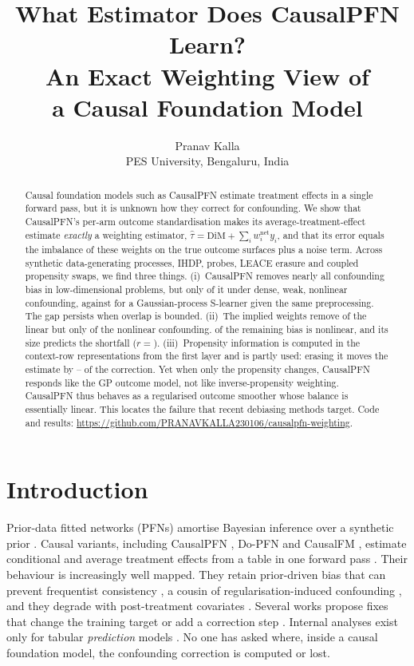 \documentclass{article}
\title{What Estimator Does CausalPFN Learn?\\An Exact Weighting View of\\a Causal Foundation Model}
\author{Pranav Kalla\\ PES University, Bengaluru, India}
\newcommand{\DiM}{\mathrm{DiM}}
\newcommand{\that}{\hat\tau}
\begin{document}
\maketitle
{}\renewcommand{\headrulewidth}{0pt}

\begin{abstract}
Causal foundation models such as CausalPFN estimate treatment effects in a single forward pass, but it is unknown how they correct for confounding. We show that CausalPFN's per-arm outcome standardisation makes its average-treatment-effect estimate \emph{exactly} a weighting estimator, $\that = \DiM + \sum_i w^{\mathrm{net}}_i y_i$, and that its error equals the imbalance of these weights on the true outcome surfaces plus a noise term. Across \nDGPhone{} synthetic data-generating processes, IHDP, probes, LEACE erasure and coupled propensity swaps, we find three things. (i)~CausalPFN removes nearly all confounding bias in low-dimensional problems, but only \kHardPFN{} of it under dense, weak, nonlinear confounding, against \kHardGP{} for a Gaussian-process S-learner given the same preprocessing. The gap persists when overlap is bounded. (ii)~The implied weights remove \linRemoved{} of the linear but only \nonlinRemoved{} of the nonlinear confounding. \nonlinShareLeft{} of the remaining bias is nonlinear, and its size predicts the shortfall ($r={}$\corrKappaNonlin). (iii)~Propensity information is computed in the context-row representations from the first layer and is partly used: erasing it moves the estimate by \eraseOne{}--\eraseAll{} of the correction. Yet when only the propensity changes, CausalPFN responds like the GP outcome model, not like inverse-propensity weighting. CausalPFN thus behaves as a regularised outcome smoother whose balance is essentially linear. This locates the failure that recent debiasing methods target. Code and results: \url{https://github.com/PRANAVKALLA230106/causalpfn-weighting}.
\end{abstract}

\section{Introduction}
Prior-data fitted networks (PFNs) amortise Bayesian inference over a synthetic prior \citep{muller2022pfn,hollmann2023tabpfn}. Causal variants, including CausalPFN \citep{balazadeh2025causalpfn}, Do-PFN \citep{robertson2025dopfn} and CausalFM \citep{ma2025causalfm}, estimate conditional and average treatment effects from a table in one forward pass \citep{stith2026cfmsurvey}. Their behaviour is increasingly well mapped. They retain prior-driven bias that can prevent frequentist consistency \citep{melnychuk2026frequentist}, a cousin of regularisation-induced confounding \citep{hahn2018regularization}, and they degrade with post-treatment covariates \citep{ham2026posttreatment}. Several works propose fixes that change the training target or add a correction step \citep{melnychuk2026frequentist,zhang2026fluctuate}. Internal analyses exist only for tabular \emph{prediction} models \citep{bilos2026mechanistic,nguyen2026standardization,gupta2026tabpfnheads,gong2026depth}. No one has asked where, inside a causal foundation model, the confounding correction is computed or lost.
\end{document}
